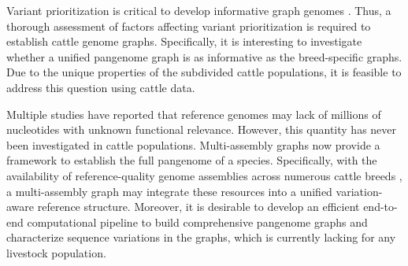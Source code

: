 \documentclass[../main.tex]{subfiles}
\begin{document}
Variant prioritization is critical to develop informative graph genomes \citep{pritt2018forge}. Thus, a thorough assessment of factors affecting variant prioritization is required to establish cattle genome graphs. Specifically, it is interesting to investigate whether a unified pangenome graph is as informative as the breed-specific graphs. Due to the unique properties of the subdivided cattle populations, it is feasible to address this question using cattle data. 

Multiple studies \citep{sherman2019assembly,li2017comprehensive,ameur2018novo} have reported that reference genomes may lack of millions of nucleotides with unknown functional relevance. However, this quantity has never been investigated in cattle populations. Multi-assembly graphs now provide a framework to establish the full pangenome of a species. Specifically, with the availability of reference-quality genome assemblies across numerous cattle breeds \citep{rice2020continuous,koren2018novo,rosen2020novo}, a multi-assembly graph may integrate these resources into a unified variation-aware reference structure. Moreover, it is desirable to develop an efficient end-to-end computational pipeline to build comprehensive pangenome graphs and characterize sequence variations in the graphs, which is currently lacking for any livestock population.


\singlespacing
\footnotesize


% 




\ifdefined\BuildingFromMainFile
\else
   
\end{document}
